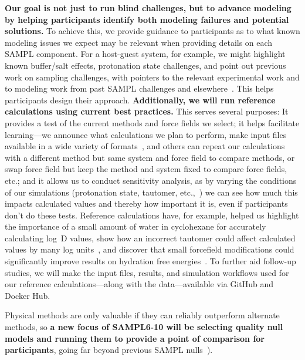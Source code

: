 \documentclass[11pt]{article}
\begin{document}
\textbf{Our goal is not just to run blind challenges, but to advance modeling by helping participants identify both modeling failures and potential solutions.} 
To achieve this, we provide guidance to participants as to what known modeling issues we expect may be relevant when providing details on each SAMPL component.
For a host-guest system, for example, we might highlight known buffer/salt effects, protonation state challenges, and point out previous work on sampling challenges, with pointers to the relevant experimental work and to modeling work from past SAMPL challenges and elsewhere~\cite{mobley_predicting_2016}.
This helps participants design their approach.
{\bf Additionally, we will run reference calculations using current best practices.} 
This serves several purposes:
It provides a test of the current methods and force fields we select; 
it helps facilitate learning---we announce what calculations we plan to perform, make input files available in a wide variety of formats~\cite{shirts_lessons_2016, yin_overview_2016, Bannan:2016:JComputAidedMolDes}, and others can repeat our calculations with a different method but same system and force field to compare methods, or swap force field but keep the method and system fixed to compare force fields, etc.; 
and it allows us to conduct sensitivity analysis, as by varying the conditions of our simulations (protonation state, tautomer, etc.,~\cite{Bannan:2016:JComputAidedMolDes}) we can see how much this impacts calculated values and thereby how important it is, even if participants don't do these tests.
Reference calculations have, for example, helped us highlight the importance of a small amount of water in cyclohexane for accurately calculating log~D values, show how an incorrect tautomer could affect calculated values by many log units~\cite{Bannan:2016:JComputAidedMolDes}, and discover that small forcefield modifications could significantly improve results on hydration free energies~\cite{mobley_blind_2014-1}.
To further aid follow-up studies, we will make the input files, results, and simulation workflows used for our reference calculations---along with the data---available via GitHub and Docker Hub.


Physical methods are only valuable if they can reliably outperform alternate methods, so \textbf{a new focus of SAMPL6-10 will be selecting quality null models and running them to provide a point of comparison for participants}, going far beyond previous SAMPL nulls~\cite{Bannan:2016:JComputAidedMolDes, paranahewage_predicting_2016, muddana_sampl4_2014}).
\end{document}
